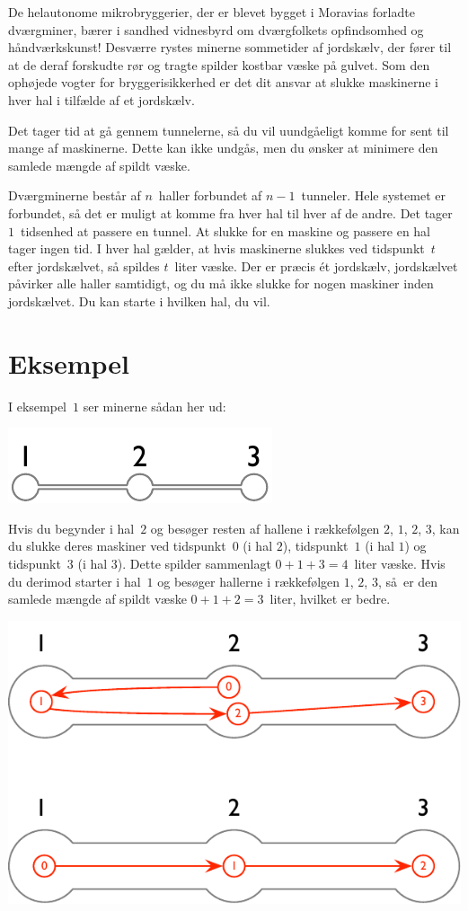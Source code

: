 
\noindent
De helautonome mikrobryggerier, der er blevet bygget i Moravias forladte dværgminer, bærer i sandhed vidnesbyrd om dværgfolkets opfindsomhed og håndværkskunst!
Desværre rystes minerne sommetider af jordskælv, der fører til at de deraf forskudte rør og tragte spilder kostbar væske på gulvet.
Som den ophøjede vogter for bryggerisikkerhed er det dit ansvar at slukke maskinerne i hver hal i tilfælde af et jordskælv.

Det tager tid at gå gennem tunnelerne,
så du vil uundgåeligt komme for sent til mange af maskinerne.
Dette kan ikke undgås, men du ønsker at minimere den samlede mængde af spildt væske.

\medskip
Dværgminerne består af $n$~haller forbundet af $n-1$~tunneler.
Hele systemet er forbundet, så det er muligt at komme fra hver hal til hver af de andre.
Det tager $1$~tidsenhed at passere en tunnel.
At slukke for en maskine og passere en hal tager ingen tid.
I hver hal gælder, at hvis maskinerne slukkes ved tidspunkt~$t$ efter jordskælvet, så spildes $t$~liter væske.
Der er præcis ét jordskælv, jordskælvet påvirker alle haller samtidigt, og du må ikke slukke for nogen maskiner inden jordskælvet.
Du kan starte i hvilken hal, du vil.



\section*{Eksempel}

I eksempel~$1$ ser minerne sådan her ud:

\includegraphics[width=.2\textwidth]{img/sample-1.pdf}

Hvis du begynder i hal~$2$ og besøger resten af hallene i rækkefølgen $2$, $1$, $2$, $3$, kan du slukke deres maskiner ved tidspunkt~$0$ (i hal $2$), tidspunkt~$1$ (i hal $1$) og tidspunkt~$3$ (i hal $3$).
Dette spilder sammenlagt $0+1+3=4$~liter væske.
Hvis du derimod starter i hal~$1$ og besøger hallerne i rækkefølgen $1$, $2$, $3$, så er den samlede mængde af spildt væske $0+1+2=3$~liter, hvilket er bedre.

\includegraphics[width=.4\textwidth]{img/sample-1-ans.pdf}

